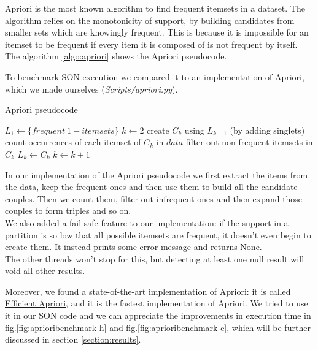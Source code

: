 \documentclass[a4paper]{article}
\begin{document}
	Apriori is the most known algorithm to find frequent itemsets in a dataset. The algorithm relies on the monotonicity of support, by building candidates from smaller sets which are knowingly frequent. 
	This is because it is impossible for an itemset to be frequent if every item it is composed of is not frequent by itself. The algorithm \ref{algo:apriori} shows the Apriori pseudocode.
	
	To benchmark SON execution we compared it to an implementation of Apriori, which we made ourselves (\textit{Scripts/apriori.py}).
	
\begin{algorithm}
\caption{Apriori pseudocode}
\label{algo:apriori}
\begin{algorithmic}[1]
	\State $L_1 \gets \{frequent \ 1-itemsets\}$ 
    	\State $k \gets 2$
    		\State create $C_k$ using $L_{k-1}$ (by adding singlets) 
    		\State count occurrences of each itemset of $C_k$ in $data$
    		\State filter out non-frequent itemsets in $C_k$
    		\State $L_k \gets C_k$
    		\State $k \gets k+1$
    	\EndWhile
\EndFunction
\end{algorithmic}
\end{algorithm}

    In our implementation of the Apriori pseudocode we first extract the items from the data, keep the frequent ones and then use them to build all the candidate couples.
	Then we count them, filter out infrequent ones and then expand those couples to form triples and so on.\\
    We also added a fail-safe feature to our implementation: if the support in a partition is so low that all possible itemsets are frequent, it doesn't even begin to create them. It instead prints 
	some error message and returns None.\\
	The other threads won't stop for this, but detecting at least one null result will void all other results.

    Moreover, we found a state-of-the-art implementation of Apriori: it is called \href{https://github.com/tommyod/Efficient-Apriori}{Efficient Apriori}, and it is the fastest implementation of Apriori. 
	We tried to use it in our SON code and we can appreciate the improvements in execution time in fig.\ref{fig:aprioribenchmark-h} and fig.\ref{fig:aprioribenchmark-e}, which will be further discussed in section \ref{section:results}. 
	
\end{document}
